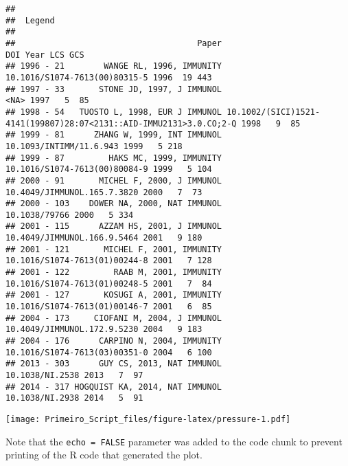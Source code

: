 \documentclass[]{article}
\begin{document}
\begin{verbatim}
## 
##  Legend
## 
##                                     Paper                                                                DOI Year LCS GCS
## 1996 - 21        WANGE RL, 1996, IMMUNITY                                      10.1016/S1074-7613(00)80315-5 1996  19 443
## 1997 - 33       STONE JD, 1997, J IMMUNOL                                                               <NA> 1997   5  85
## 1998 - 54   TUOSTO L, 1998, EUR J IMMUNOL 10.1002/(SICI)1521-4141(199807)28:07<2131::AID-IMMU2131>3.0.CO;2-Q 1998   9  85
## 1999 - 81      ZHANG W, 1999, INT IMMUNOL                                            10.1093/INTIMM/11.6.943 1999   5 218
## 1999 - 87         HAKS MC, 1999, IMMUNITY                                      10.1016/S1074-7613(00)80084-9 1999   5 104
## 2000 - 91       MICHEL F, 2000, J IMMUNOL                                        10.4049/JIMMUNOL.165.7.3820 2000   7  73
## 2000 - 103    DOWER NA, 2000, NAT IMMUNOL                                                      10.1038/79766 2000   5 334
## 2001 - 115      AZZAM HS, 2001, J IMMUNOL                                        10.4049/JIMMUNOL.166.9.5464 2001   9 180
## 2001 - 121       MICHEL F, 2001, IMMUNITY                                      10.1016/S1074-7613(01)00244-8 2001   7 128
## 2001 - 122         RAAB M, 2001, IMMUNITY                                      10.1016/S1074-7613(01)00248-5 2001   7  84
## 2001 - 127       KOSUGI A, 2001, IMMUNITY                                      10.1016/S1074-7613(01)00146-7 2001   6  85
## 2004 - 173     CIOFANI M, 2004, J IMMUNOL                                        10.4049/JIMMUNOL.172.9.5230 2004   9 183
## 2004 - 176      CARPINO N, 2004, IMMUNITY                                      10.1016/S1074-7613(03)00351-0 2004   6 100
## 2013 - 303      GUY CS, 2013, NAT IMMUNOL                                                    10.1038/NI.2538 2013   7  97
## 2014 - 317 HOGQUIST KA, 2014, NAT IMMUNOL                                                    10.1038/NI.2938 2014   5  91
\end{verbatim}

\texttt{[image: Primeiro\_Script\_files/figure-latex/pressure-1.pdf]}

Note that the \texttt{echo\ =\ FALSE} parameter was added to the code
chunk to prevent printing of the R code that generated the plot.
\end{document}
